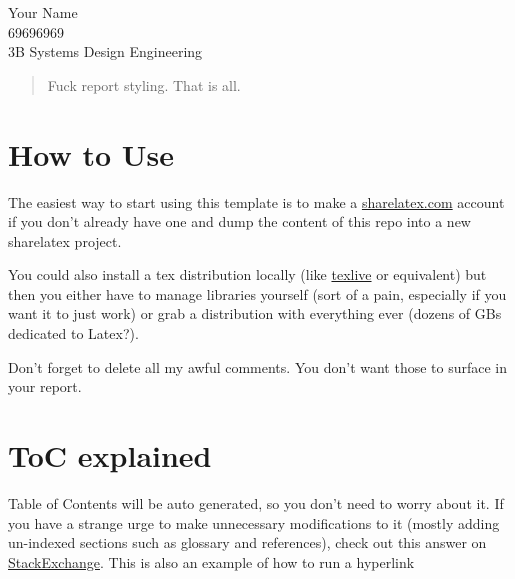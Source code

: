 \documentclass[12pt]{article}
\def\studentName{Your Name}
\def\studentNumber{69696969}
\begin{document}
    	\studentName \\
    	\studentNumber \\
        3B Systems Design Engineering

	\newpage


	\begin{abstract}
	    Fuck report styling. That is all.
	\end{abstract}


	\tableofcontents

	\listoffigures
	
	
	\listoftables

	
	
	\section{How to Use}

    The easiest way to start using this template is to make a \href{https://www.sharelatex.com}{sharelatex.com} account if you don't already have one and dump the content of this repo into a new sharelatex project.

    You could also install a tex distribution locally (like \href{https://www.tug.org/texlive/}{texlive} or equivalent) but then you either have to manage libraries yourself (sort of a pain, especially if you want it to just work) or grab a distribution with everything ever (dozens of GBs dedicated to Latex?).
    
    Don't forget to delete all my awful comments. You don't want those to surface in your report.

	\section{ToC explained}
	
	Table of Contents will be auto generated, so you don't need to worry about it. If you have a strange urge to make unnecessary modifications to it (mostly adding un-indexed sections such as glossary and references), check out this answer on
    \href{https://tex.stackexchange.com/questions/119719/add-an-item-in-the-table-of-contents}{StackExchange}. This is also an example of how to run a hyperlink
    
\end{document}

